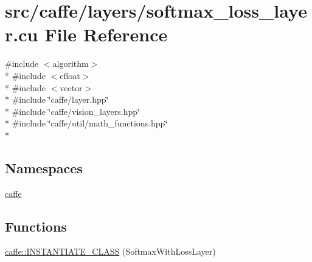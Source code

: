 \hypertarget{softmax__loss__layer_8cu}{\section{src/caffe/layers/softmax\+\_\+loss\+\_\+layer.cu File Reference}
\label{softmax__loss__layer_8cu}
}
{\ttfamily \#include $<$algorithm$>$}\\*
{\ttfamily \#include $<$cfloat$>$}\\*
{\ttfamily \#include $<$vector$>$}\\*
{\ttfamily \#include \char`\"{}caffe/layer.\+hpp\char`\"{}}\\*
{\ttfamily \#include \char`\"{}caffe/vision\+\_\+layers.\+hpp\char`\"{}}\\*
{\ttfamily \#include \char`\"{}caffe/util/math\+\_\+functions.\+hpp\char`\"{}}\\*
\subsection*{Namespaces}
\begin{DoxyCompactItemize}
\item 
 \hyperlink{namespacecaffe}{caffe}
\end{DoxyCompactItemize}
\subsection*{Functions}
\begin{DoxyCompactItemize}
\item 
\hyperlink{namespacecaffe_a012dfaa945f436a700b3f0dbf033c893}{caffe\+::\+I\+N\+S\+T\+A\+N\+T\+I\+A\+T\+E\+\_\+\+C\+L\+A\+S\+S} (Softmax\+With\+Loss\+Layer)
\end{DoxyCompactItemize}
